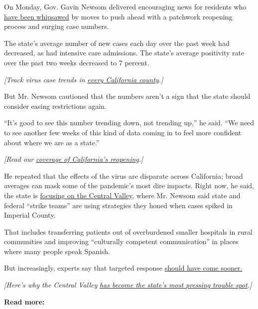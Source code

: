 On Monday, Gov. Gavin Newsom delivered encouraging news for residents
who
\href{https://www.nytimes.com/2020/07/23/us/california-covid-19-cases.html}{have
been whipsawed} by moves to push ahead with a patchwork reopening
process and surging case numbers.

The state's average number of new cases each day over the past week had
decreased, as had intensive care admissions. The state's average
positivity rate over the past two weeks decreased to 7 percent.

\emph{{[}Track virus case trends in}
\href{https://www.nytimes.com/interactive/2020/us/california-coronavirus-cases.html}{\emph{every
California county}}\emph{.{]}}

But Mr. Newsom cautioned that the numbers aren't a sign that the state
should consider easing restrictions again.

``It's good to see this number trending down, not trending up,'' he
said. ``We need to see another few weeks of this kind of data coming in
to feel more confident about where we are as a state.''

\emph{{[}Read our}
\href{https://www.nytimes.com/article/coronavirus-california-reopening-phases.html}{\emph{coverage
of California's reopening}}\emph{.{]}}

He repeated that the effects of the virus are disparate across
California; broad averages can mask some of the pandemic's most dire
impacts. Right now, he said, the state is
\href{https://www.nytimes.com/2020/07/28/us/newsom-coronavirus-valley.html}{focusing
on the Central Valley}, where Mr. Newsom said state and federal ``strike
teams'' are using strategies they honed when cases spiked in Imperial
County.

That includes transferring patients out of overburdened smaller
hospitals in rural communities and improving ``culturally competent
communication'' in places where many people speak Spanish.

But increasingly, experts say that targeted response
\href{https://www.nytimes.com/2020/07/30/us/coronavirus-california-health-equity.html}{should
have come sooner.}

\emph{{[}Here's why the Central Valley}
\href{https://www.nytimes.com/2020/07/28/us/newsom-coronavirus-valley.html}{\emph{has
become the state's most pressing trouble spot}}\emph{.{]}}

\textbf{Read more:}

